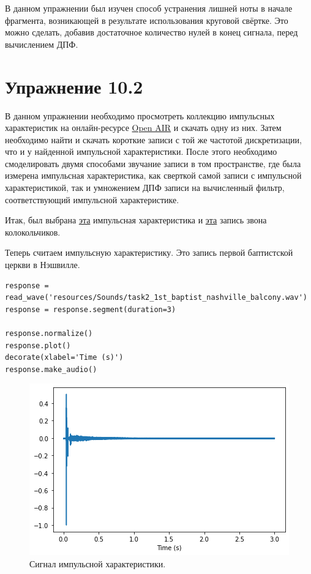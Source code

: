 \documentclass[a4paper, 14pt]{extarticle}
\begin{document}
    В данном упражнении был изучен способ устранения лишней ноты в начале фрагмента, возникающей в результате
    использования круговой свёртке. Это можно сделать, добавив достаточное количество нулей в конец сигнала, перед
    вычислением ДПФ.

    \newpage

    \section{Упражнение 10.2}
    \label{sec:task2}

    В данном упражнении необходимо просмотреть коллекцию импульсных характеристик на онлайн-ресурсе
    \href{http://www.openairlib.net}{Open AIR} и скачать одну из них. Затем необходимо найти и скачать короткие записи
    с той же частотой дискретизации, что и у найденной импульсной характеристики. После этого необходимо смоделировать
    двумя способами звучание записи в том пространстве, где была измерена импульсная характеристика, как сверткой самой
    записи с импульсной характеристикой, так и умножением ДПФ записи на вычисленный фильтр, соответствующий импульсной
    характеристике.

    Итак, был выбрана \href{https://www.openair.hosted.york.ac.uk/?page_id=406}{эта} импульсная характеристика и
    \href{https://freesound.org/people/stomachache/sounds/231275/}{эта} запись звона колокольчиков.

    Теперь считаем импульсную характеристику. Это запись первой баптистской церкви в Нэшвилле.

    \begin{lstlisting}[caption= Чтение записи и формирование сигнала., label={lst:task2_response}]
response = read_wave('resources/Sounds/task2_1st_baptist_nashville_balcony.wav')
response = response.segment(duration=3)

response.normalize()
response.plot()
decorate(xlabel='Time (s)')
response.make_audio()   \end{lstlisting}

    \begin{figure}[h]
        \centering
        \includegraphics[width=0.7\linewidth]{resources/Images/task2_response}
        \caption{Сигнал импульсной характеристики.}
        \label{fig:task2_response}
    \end{figure}
\end{document}

